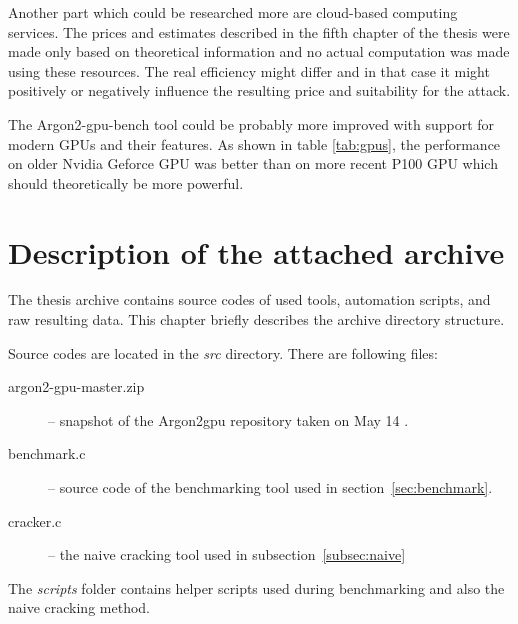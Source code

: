 \documentclass[nolof,digital]{fithesis3}
\begin{document}
Another part which could be researched more are cloud-based computing services. The prices and estimates described in the fifth chapter of the thesis were made only based on theoretical information and no actual computation was made using these resources. The real efficiency might differ and in that case it might positively or negatively influence the resulting price and suitability for the attack.

The Argon2-gpu-bench tool could be probably more improved with support for modern GPUs and their features. As shown in table \ref{tab:gpus}, the performance on older Nvidia Geforce GPU was better than on more recent P100 GPU which should theoretically be more powerful.

\printbibliography
\appendix
\chapter{Description of the attached archive}
The thesis archive contains source codes of used tools, automation scripts, and raw resulting data. This chapter briefly describes the archive directory structure.

Source codes are located in the \emph{src} directory. There are following files:

\begin{description}
\item[argon2-gpu-master.zip] -- snapshot of the Argon2gpu repository taken on May 14 \parencite{argon2gpuvojta}.

\item[benchmark.c] -- source code of the benchmarking tool used in section~\ref{sec:benchmark}.

\item[cracker.c] -- the naive cracking tool used in subsection~\ref{subsec:naive}
\end{description}

The \emph{scripts} folder contains helper scripts used during benchmarking and also the naive cracking method.
\end{document}
